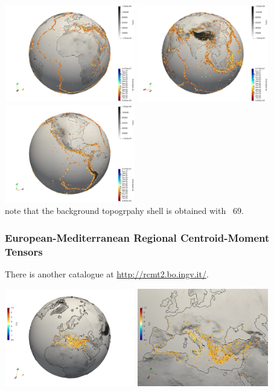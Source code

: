 \begin{center}
\includegraphics[width=5.7cm]{python_codes/fieldstone_134/images/visu1}
\includegraphics[width=5.7cm]{python_codes/fieldstone_134/images/visu2}
\includegraphics[width=5.7cm]{python_codes/fieldstone_134/images/visu3}\\
{\captionfont note that the background topogrpahy shell is obtained 
with \stone~69.}
\end{center}


\subsubsection*{European-Mediterranean Regional Centroid-Moment Tensors}

There is another catalogue at \url{http://rcmt2.bo.ingv.it/}.

\begin{center}
\includegraphics[width=5.7cm]{python_codes/fieldstone_134/images/visu5}
\includegraphics[width=5.7cm]{python_codes/fieldstone_134/images/visu4}
\end{center}


